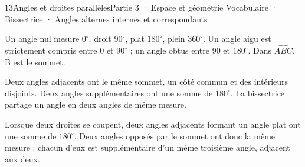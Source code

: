 \begin{ouverture}[geometrie]{13}{Angles et droites parallèles}{Partie 3 · Espace et géométrie}
{Vocabulaire · Bissectrice · Angles alternes internes et correspondants}
\end{ouverture}
\pagestyle{otMain}\essentiel\fontsize{11}{15}\selectfont
{}\label{cours-13-1}
\begin{definition}Un angle nul mesure $0^\circ$, droit $90^\circ$, plat $180^\circ$, plein $360^\circ$. Un angle aigu est strictement compris entre 0 et $90^\circ$ ; un angle obtus entre 90 et $180^\circ$. Dans $\widehat{ABC}$, B est le sommet.\end{definition}
\label{fig-cours-13-1-cours-angles}

\begin{definition}Deux angles adjacents ont le même sommet, un côté commun et des intérieurs disjoints. Deux angles supplémentaires ont une somme de $180^\circ$. La bissectrice partage un angle en deux angles de même mesure.\end{definition}
\begin{propriete}Lorsque deux droites se coupent, deux angles adjacents formant un angle plat ont une somme de $180^\circ$. Deux angles opposés par le sommet ont donc la même mesure : chacun d’eux est supplémentaire d’un même troisième angle, adjacent aux deux.\end{propriete}
\clearpage
{}\label{cours-13-2}
\label{fig-cours-13-2-cours-paralleles}

